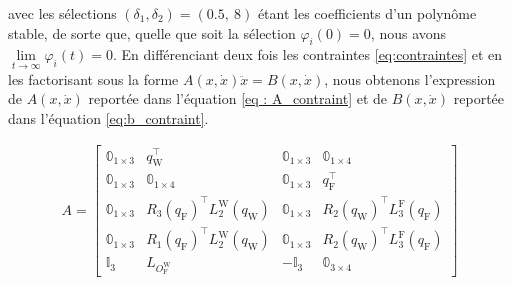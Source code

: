 avec les sélections $(\delta_{1}, \delta_{2}) = (0.5,~8)$ étant les coefficients d'un polynôme stable, de sorte que, quelle que soit la sélection $\varphi_{i}(0) = 0$, nous avons $\lim\limits_{t \to \infty} \varphi_{i}(t) = 0$. En différenciant deux fois les contraintes \eqref{eq:contraintes} et en les factorisant sous la forme $ A(x,\dot{x}) \ddot{x} = B(x,\dot{x})$, nous obtenons l'expression de $A(x,\dot{x})$ reportée dans l'équation \eqref{eq : A_contraint} et de $B(x,\dot{x})$ reportée dans l'équation \eqref{eq:b_contraint}.

\begin{align}
\label{eq:A_contraint}
    A = \begin{bmatrix}
            \mathbb{0}_{1 \times 3} & q_{\text{W}}^\top & \mathbb{0}_{1 \times 3} & \mathbb{0}_{1 \times 4}\\
            \mathbb{0}_{1 \times 3} & \mathbb{0}_{1 \times 4} & \mathbb{0}_{1 \times 3} & q_{\text{F}}^\top\\
            \mathbb{0}_{1 \times 3} & R_{3}(q_{\text{F}})^\top L_{2}^{\text{W}}( q_{\text{W}} ) & \mathbb{0}_{1 \times 3} & R_{2}(q_{\text{W}})^\top L_{3}^{\text{F}}( q_{\text{F}} ) \\
            \mathbb{0}_{1 \times 3} & R_{1}(q_{\text{F}})^\top L_{2}^{\text{W}}( q_{\text{W}} ) & \mathbb{0}_{1 \times 3} & R_{2}(q_{\text{W}})^\top L_{3}^{\text{F}}( q_{\text{F}} ) \\
            \mathbb{I}_{3} & L_{O_{\text{F}}^{\text{W}}} & -\mathbb{I}_{3} & \mathbb{0}_{3 \times 4}
        \end{bmatrix}
\end{align}

